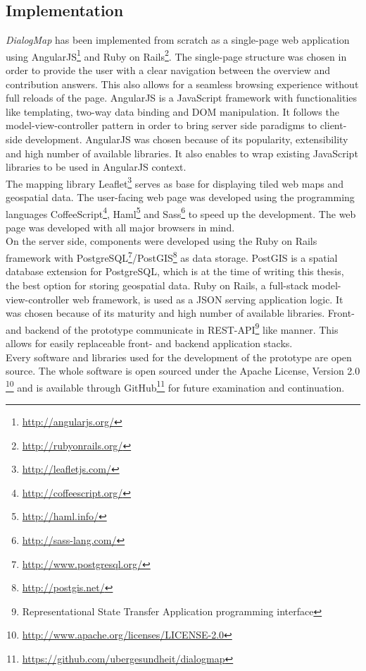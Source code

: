 \subsection{Implementation}
\label{sub:implementation}
\textit{DialogMap} has been implemented from scratch as a single-page web application using AngularJS\footnote{\url{http://angularjs.org/}} and Ruby on Rails\footnote{\url{http://rubyonrails.org/}}. The single-page structure was chosen in order to provide the user with a clear navigation between the overview and contribution answers. This also allows for a seamless browsing experience without full reloads of the page. AngularJS is a JavaScript framework with functionalities like templating, two-way data binding and DOM manipulation. It follows the model-view-controller pattern in order to bring server side paradigms to client-side development. AngularJS was chosen because of its popularity, extensibility and high number of available libraries. It also enables to wrap existing JavaScript libraries to be used in AngularJS context.\\
The mapping library Leaflet\footnote{\url{http://leafletjs.com/}} serves as base for displaying tiled web maps and geospatial data. The user-facing web page was developed using the programming languages CoffeeScript\footnote{\url{http://coffeescript.org/}}, Haml\footnote{\url{http://haml.info/}} and Sass\footnote{\url{http://sass-lang.com/}} to speed up the development. The web page was developed with all major browsers in mind. \\
On the server side, components were developed using the Ruby on Rails framework with PostgreSQL\footnote{\url{http://www.postgresql.org/}}/PostGIS\footnote{\url{http://postgis.net/}} as data storage. PostGIS is a spatial database extension for PostgreSQL, which is at the time of writing this thesis, the best option for storing geospatial data. Ruby on Rails, a full-stack model-view-controller web framework, is used as a JSON serving application logic. It was chosen because of its maturity and high number of available libraries. Front- and backend of the prototype communicate in REST-API\footnote{Representational State Transfer Application programming interface} like manner. This allows for easily replaceable front- and backend application stacks.\\
Every software and libraries used for the development of the prototype are open source. The whole software is open sourced under the Apache License, Version 2.0 \footnote{\url{http://www.apache.org/licenses/LICENSE-2.0}} and is available through GitHub\footnote{\url{https://github.com/ubergesundheit/dialogmap}} for future examination and continuation.


